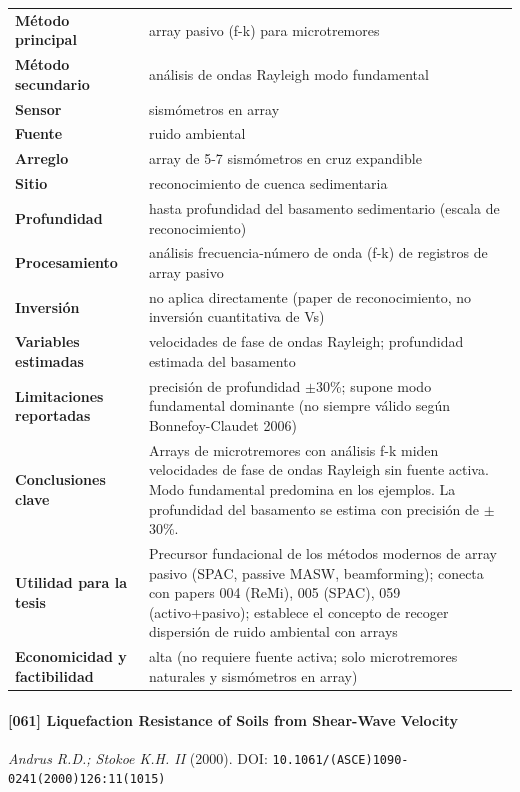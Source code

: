 \begin{center}\scriptsize
\begin{tabularx}{\textwidth}{@{}>{\bfseries}p{3.3cm} X@{}}
\toprule
M\'etodo principal & array pasivo (f-k) para microtremores \\
M\'etodo secundario & análisis de ondas Rayleigh modo fundamental \\
Sensor & sismómetros en array \\
Fuente & ruido ambiental \\
Arreglo & array de 5-7 sismómetros en cruz expandible \\
Sitio & reconocimiento de cuenca sedimentaria \\
Profundidad & hasta profundidad del basamento sedimentario (escala de reconocimiento) \\
Procesamiento & análisis frecuencia-número de onda (f-k) de registros de array pasivo \\
Inversi\'on & no aplica directamente (paper de reconocimiento, no inversión cuantitativa de Vs) \\
Variables estimadas & velocidades de fase de ondas Rayleigh; profundidad estimada del basamento \\
Limitaciones reportadas & precisión de profundidad $\pm$30\%; supone modo fundamental dominante (no siempre válido según Bonnefoy-Claudet 2006) \\
Conclusiones clave & Arrays de microtremores con análisis f-k miden velocidades de fase de ondas Rayleigh sin fuente activa. Modo fundamental predomina en los ejemplos. La profundidad del basamento se estima con precisión de $\pm$30\%. \\
Utilidad para la tesis & Precursor fundacional de los métodos modernos de array pasivo (SPAC, passive MASW, beamforming); conecta con papers 004 (ReMi), 005 (SPAC), 059 (activo+pasivo); establece el concepto de recoger dispersión de ruido ambiental con arrays \\
Economicidad y factibilidad & alta (no requiere fuente activa; solo microtremores naturales y sismómetros en array) \\
\bottomrule
\end{tabularx}
\end{center}

\paragraph{[061] Liquefaction Resistance of Soils from Shear-Wave Velocity} \emph{Andrus R.D.; Stokoe K.H. II} (2000).
{\scriptsize DOI: \texttt{10.1061/(ASCE)1090-0241(2000)126:11(1015)}}

